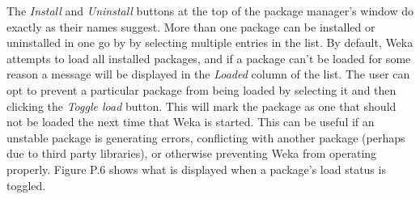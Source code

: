 The \textit{Install} and \textit{Uninstall} buttons at the top of the
package manager's window do exactly as their names suggest. More than
one package can be installed or uninstalled in one go by by selecting
multiple entries in the list. By default, Weka attempts to load all
installed packages, and if a package can't be loaded for some reason a
message will be displayed in the \textit{Loaded} column of the
list. The user can opt to prevent a particular package from being
loaded by selecting it and then clicking the \textit{Toggle load}
button. This will mark the package as one that should not be loaded
the next time that Weka is started. This can be useful if an unstable
package is generating errors, conflicting with another package
(perhaps due to third party libraries), or otherwise preventing Weka
from operating properly. Figure P.6 shows what is displayed when a
package's load status is toggled.

